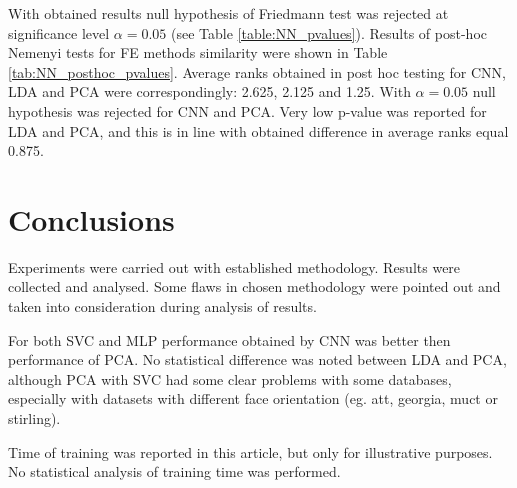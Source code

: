 \documentclass[a4paper, 10 pt, conference]{ieeeconf}
\begin{document}
\newpage

With obtained results null hypothesis of Friedmann test was rejected at significance level $\alpha = 0.05$ (see Table \ref{table:NN_pvalues}). 
Results of post-hoc Nemenyi tests for FE methods similarity were shown in Table \ref{tab:NN_posthoc_pvalues}. 
Average ranks obtained in post hoc testing for CNN, LDA and PCA were correspondingly: 2.625, 2.125 and 1.25.
With $\alpha = 0.05$ null hypothesis was rejected for CNN and PCA.
Very low p-value was reported for LDA and PCA, and this is in line with obtained difference in average ranks equal 0.875.


\section{Conclusions}

Experiments were carried out with established methodology. Results were collected and analysed. Some flaws in chosen methodology were pointed out and taken into consideration during analysis of results.

For both SVC and MLP performance obtained by CNN was better then performance of PCA. No statistical difference was noted between LDA and PCA, although PCA with SVC had some clear problems with some databases, especially with datasets with different face orientation (eg. att, georgia, muct or stirling).

Time of training was reported in this article, but only for illustrative purposes. No statistical analysis of training time was performed.





\end{document}
